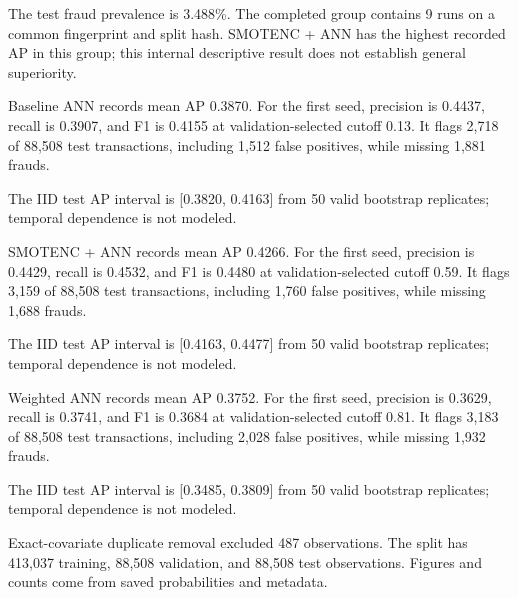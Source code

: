 The test fraud prevalence is 3.488\%. The completed group contains 9 runs on a common fingerprint and split hash. SMOTENC + ANN has the highest recorded AP in this group; this internal descriptive result does not establish general superiority.

Baseline ANN records mean AP 0.3870. For the first seed, precision is 0.4437, recall is 0.3907, and F1 is 0.4155 at validation-selected cutoff 0.13. It flags 2,718 of 88,508 test transactions, including 1,512 false positives, while missing 1,881 frauds.

The IID test AP interval is [0.3820, 0.4163] from 50 valid bootstrap replicates; temporal dependence is not modeled.

SMOTENC + ANN records mean AP 0.4266. For the first seed, precision is 0.4429, recall is 0.4532, and F1 is 0.4480 at validation-selected cutoff 0.59. It flags 3,159 of 88,508 test transactions, including 1,760 false positives, while missing 1,688 frauds.

The IID test AP interval is [0.4163, 0.4477] from 50 valid bootstrap replicates; temporal dependence is not modeled.

Weighted ANN records mean AP 0.3752. For the first seed, precision is 0.3629, recall is 0.3741, and F1 is 0.3684 at validation-selected cutoff 0.81. It flags 3,183 of 88,508 test transactions, including 2,028 false positives, while missing 1,932 frauds.

The IID test AP interval is [0.3485, 0.3809] from 50 valid bootstrap replicates; temporal dependence is not modeled.

Exact-covariate duplicate removal excluded 487 observations. The split has 413,037 training, 88,508 validation, and 88,508 test observations. Figures and counts come from saved probabilities and metadata.